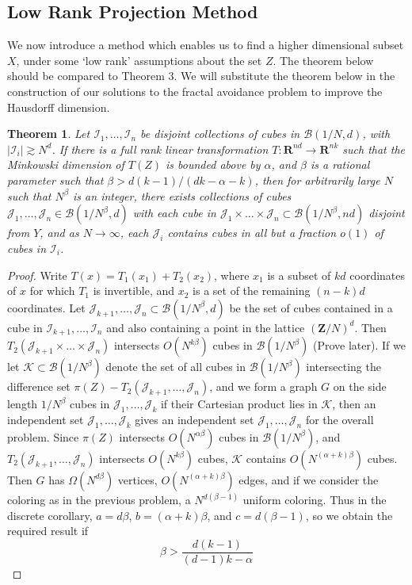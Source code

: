 \documentclass{article}
\theoremstyle{plain}
\theoremstyle{plain}
\newtheorem{theorem}{Theorem}
\begin{document}
\begin{multicols}{2}
\section{Low Rank Projection Method}

We now introduce a method which enables us to find a higher dimensional subset $X$, under some `low rank' assumptions about the set $Z$. The theorem below should be compared to Theorem 3. We will substitute the theorem below in the construction of our solutions to the fractal avoidance problem to improve the Hausdorff dimension.

\begin{theorem}
	Let $\mathcal{I}_1, \dots, \mathcal{I}_n$ be disjoint collections of cubes in $\mathcal{B}(1/N,d)$, with $|\mathcal{I}_i| \gtrsim N^d$. If there is a full rank linear transformation $T: \mathbf{R}^{nd} \to \mathbf{R}^{nk}$ such that the Minkowski dimension of $T(Z)$ is bounded above by $\alpha$, and $\beta$ is a rational parameter such that $\beta > d(k-1)/(dk - \alpha - k)$, then for arbitrarily large $N$ such that $N^\beta$ is an integer, there exists collections of cubes $\mathcal{J}_1, \dots, \mathcal{J}_n \in \mathcal{B}(1/N^\beta,d)$ with each cube in $\mathcal{J}_1 \times \dots \times \mathcal{J}_n \subset \mathcal{B}(1/N^\beta,nd)$ disjoint from $Y$, and as $N \to \infty$, each $\mathcal{J}_i$ contains cubes in all but a fraction $o(1)$ of cubes in $\mathcal{I}_i$.
\end{theorem}
\begin{proof}
	Write $T(x) = T_1(x_1) + T_2(x_2)$, where $x_1$ is a subset of $kd$ coordinates of $x$ for which $T_1$ is invertible, and $x_2$ is a set of the remaining $(n-k)d$ coordinates. Let $\mathcal{J}_{k+1}, \dots, \mathcal{J}_n \subset \mathcal{B}(1/N^\beta,d)$ be the set of cubes contained in a cube in $\mathcal{I}_{k+1}, \dots, \mathcal{I}_n$ and also containing a point in the lattice $(\mathbf{Z}/N)^d$. Then $T_2(\mathcal{J}_{k+1} \times \dots \times \mathcal{J}_n)$ intersects $O(N^{k\beta} )$ cubes in $\mathcal{B}(1/N^\beta)$ (Prove later). If we let $\mathcal{K} \subset \mathcal{B}(1/N^\beta)$ denote the set of all cubes in $\mathcal{B}(1/N^\beta)$ intersecting the difference set $\pi(Z) - T_2(\mathcal{J}_{k+1}, \dots, \mathcal{J}_n)$, and we form a graph $G$ on the side length $1/N^\beta$ cubes in $\mathcal{J}_1, \dots, \mathcal{J}_k$ if their Cartesian product lies in $\mathcal{K}$, then an independent set $\mathcal{J}_1, \dots, \mathcal{J}_k$ gives an independent set $\mathcal{J}_1, \dots, \mathcal{J}_n$ for the overall problem. Since $\pi(Z)$ intersects $O(N^{\alpha \beta})$ cubes in $\mathcal{B}(1/N^\beta)$, and $T_2(\mathcal{J}_{k+1}, \dots, \mathcal{J}_n)$ intersects $O(N^{k \beta})$ cubes, $\mathcal{K}$ contains $O(N^{(\alpha + k) \beta})$ cubes. Then $G$ has $\Omega(N^{d \beta})$ vertices, $O(N^{(\alpha + k)\beta})$ edges, and if we consider the coloring as in the previous problem, a $N^{d(\beta - 1)}$ uniform coloring. Thus in the discrete corollary, $a = d \beta$, $b = (\alpha + k)\beta$, and $c = d(\beta - 1)$, so we obtain the required result if
	\[ \beta > \frac{d (k-1)}{(d-1)k - \alpha} \]
\end{proof}


\end{multicols}
\end{document}
